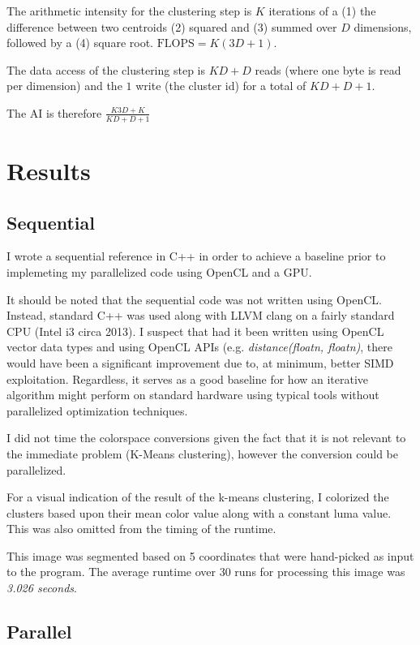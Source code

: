 \documentclass[11pt]{article}
\begin{document}
The arithmetic intensity for the clustering step is $K$ iterations of a (1) the difference
between two centroids (2) squared and (3) summed over $D$ dimensions, followed by a (4)
square root. $\text{FLOPS} = K(3D+1)$.

The data access of the clustering step is $KD+D$ reads (where one byte is read per dimension)
and the $1$ write (the cluster id) for a total of $KD+D+1$.

The AI is therefore $\frac{K3D+K}{KD+D+1}$

\section{Results}

\subsection{Sequential}

I wrote a sequential reference in C++ in order to achieve a baseline prior to implemeting
my parallelized code using OpenCL and a GPU.

It should be noted that the sequential code was not written using OpenCL. Instead, standard C++
was used along with LLVM clang on a fairly standard CPU (Intel i3 circa 2013). I suspect that
had it been written using OpenCL vector data types and using OpenCL APIs (e.g.
\textit{distance(floatn, floatn)}, there would  have been a significant improvement due to,
at minimum, better SIMD exploitation. Regardless, it serves as a good baseline for how an
iterative algorithm might perform on standard hardware using typical tools without parallelized
optimization techniques.

I did not time the colorspace conversions given the fact that it is not relevant to the
immediate problem (K-Means clustering), however the conversion could be parallelized.

For a visual indication of the result of the k-means clustering, I colorized the clusters
based upon their mean color value along with a constant luma value. This was also omitted
from the timing of the runtime.

This image was segmented based on 5 coordinates that were hand-picked as input to the program.
The average runtime over 30 runs for processing this image was \emph{3.026 seconds}.

\subsection{Parallel}
\end{document}

